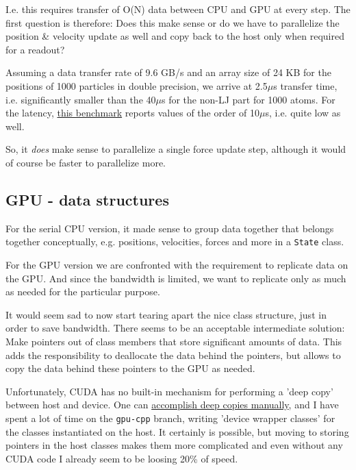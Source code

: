 \documentclass{scrartcl}
\begin{document}
I.e. this requires transfer of O(N) data between CPU and GPU at every step.
The first question is therefore: Does this make sense or 
do we have to parallelize
the position \& velocity update as well and copy back to the host
only when required for a readout?

Assuming a data transfer rate of 9.6 GB/s and an array size of
24 KB for the positions of 1000 particles in double precision,
we arrive at 2.5$\mu$s transfer time, 
i.e. significantly smaller than the 40$\mu$s
for the non-LJ part for 1000 atoms.
For the latency, \href{http://www.princeton.edu/~dlustig/dlustig_HPCA13.pdf}{this benchmark}
reports values of the order of 10$\mu$s, i.e. quite low as well.

So, it \emph{does} make sense to parallelize a single force 
update step, although it would of course be faster
to parallelize more.


\subsection{GPU - data structures}

For the serial CPU version, it made sense to group data together that
belongs together conceptually, e.g. positions, velocities, forces and more
in a \verb|State| class.

For the GPU version we are confronted with the requirement to replicate
data on the GPU. And since the bandwidth is limited, we want to replicate only
as much as needed for the particular purpose.

It would seem sad to now start tearing apart the nice class structure,
just in order to save bandwidth.
There seems to be an acceptable intermediate solution: 
Make pointers out of class members that store significant amounts of data.
This adds the responsibility to deallocate the data behind the pointers,
but allows to copy the data behind these pointers to the GPU as needed.

Unfortunately, CUDA has no built-in mechanism for performing a 'deep copy'
between host and device.
One can
\href{http://stackoverflow.com/questions/15431365/cudamemcpy-segmentation-fault/15435592#15435592}{accomplish deep copies manually},
and I have spent a lot of time on the \verb|gpu-cpp| branch, 
writing 'device wrapper classes' for the classes instantiated on the host.
It certainly is possible, but moving to storing pointers in the host classes
makes them more complicated and even without any CUDA code
I already seem to be loosing 20\% of speed.
\end{document}
